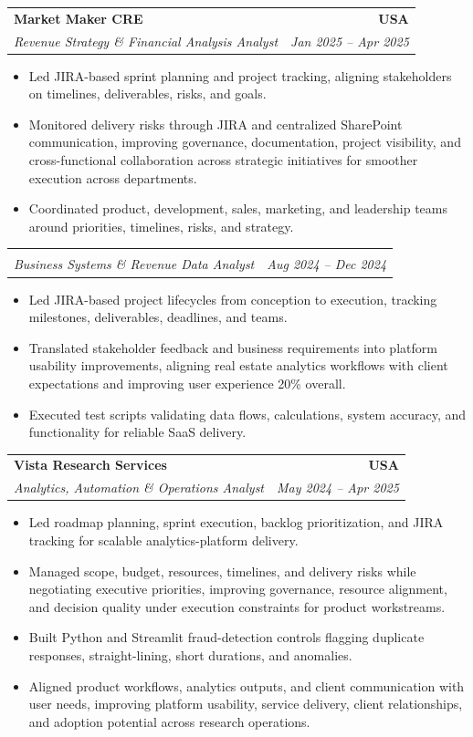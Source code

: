 \documentclass[letterpaper,10pt]{article}
\makeatletter
\newcommand{\resumeItem}[1]{\item \small{#1}}
\newcommand{\resumeSubheading}[4]{
  \vspace{1pt}\item
    \begin{tabular*}{1.0\textwidth}[t]{l@{\extracolsep{\fill}}r}
      \textbf{#1} & \textbf{\small #2} \\
      \textit{\small #3} & \textit{\small #4} \\
    \end{tabular*}\vspace{-6pt}
}
\newcommand{\resumeItemListStart}{\begin{itemize}[leftmargin=0.15in, itemsep=1pt, topsep=3pt]}
\newcommand{\resumeItemListEnd}{\end{itemize}\vspace{-2pt}}
\makeatother
\begin{document}
\vspace{-2pt}

\resumeSubheading
{Market Maker CRE}{USA}
{Revenue Strategy \& Financial Analysis Analyst}{Jan 2025 -- Apr 2025}
\resumeItemListStart
\resumeItem{Led JIRA-based sprint planning and project tracking, aligning stakeholders on timelines, deliverables, risks, and goals.}
\resumeItem{Monitored delivery risks through JIRA and centralized SharePoint communication, improving governance, documentation, project visibility, and cross-functional collaboration across strategic initiatives for smoother execution across departments.}
\resumeItem{Coordinated product, development, sales, marketing, and leadership teams around priorities, timelines, risks, and strategy.}
\resumeItemListEnd

\vspace{-2pt}

\resumeSubheading
{}{}
{Business Systems \& Revenue Data Analyst}{Aug 2024 -- Dec 2024}
\resumeItemListStart
\resumeItem{Led JIRA-based project lifecycles from conception to execution, tracking milestones, deliverables, deadlines, and teams.}
\resumeItem{Translated stakeholder feedback and business requirements into platform usability improvements, aligning real estate analytics workflows with client expectations and improving user experience 20\% overall.}
\resumeItem{Executed test scripts validating data flows, calculations, system accuracy, and functionality for reliable SaaS delivery.}
\resumeItemListEnd

\vspace{-2pt}

\resumeSubheading
{Vista Research Services}{USA}
{Analytics, Automation \& Operations Analyst}{May 2024 -- Apr 2025}
\resumeItemListStart
\resumeItem{Led roadmap planning, sprint execution, backlog prioritization, and JIRA tracking for scalable analytics-platform delivery.}
\resumeItem{Managed scope, budget, resources, timelines, and delivery risks while negotiating executive priorities, improving governance, resource alignment, and decision quality under execution constraints for product workstreams.}
\resumeItem{Built Python and Streamlit fraud-detection controls flagging duplicate responses, straight-lining, short durations, and anomalies.}
\resumeItem{Aligned product workflows, analytics outputs, and client communication with user needs, improving platform usability, service delivery, client relationships, and adoption potential across research operations.}
\resumeItemListEnd

\vspace{-2pt}
\end{document}
